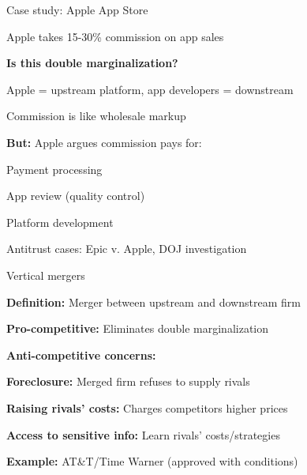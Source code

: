 \documentclass[notes,11pt, aspectratio=169]{beamer}
\newenvironment{wideitemize}{\itemize\addtolength{\itemsep}{10pt}}{\enditemize}
\newenvironment{wideenumerate}{\enumerate\addtolength{\itemsep}{10pt}}{\endenumerate}
\begin{document}
\begin{frame}{Case study: Apple App Store}
	\begin{wideitemize}
		\item Apple takes 15-30\% commission on app sales
		\item \textbf{Is this double marginalization?}
		\begin{wideitemize}
			\vspace{5pt}
			\item Apple = upstream platform, app developers = downstream
			\item Commission is like wholesale markup
		\end{wideitemize}
		\item \textbf{But:} Apple argues commission pays for:
		\begin{wideitemize}
			\vspace{5pt}
			\item Payment processing
			\item App review (quality control)
			\item Platform development
		\end{wideitemize}
		\item Antitrust cases: Epic v. Apple, DOJ investigation
	\end{wideitemize}
\end{frame}

\begin{frame}{Vertical mergers}
	\begin{wideitemize}
		\item \textbf{Definition:} Merger between upstream and downstream firm
		\item \textbf{Pro-competitive:} Eliminates double marginalization
		\item \textbf{Anti-competitive concerns:}
		\begin{wideenumerate}
			\vspace{5pt}
			\item \textbf{Foreclosure:} Merged firm refuses to supply rivals
			\item \textbf{Raising rivals' costs:} Charges competitors higher prices
			\item \textbf{Access to sensitive info:} Learn rivals' costs/strategies
		\end{wideenumerate}
		\item \textbf{Example:} AT\&T/Time Warner (approved with conditions)
	\end{wideitemize}
\end{frame}
\end{document}
